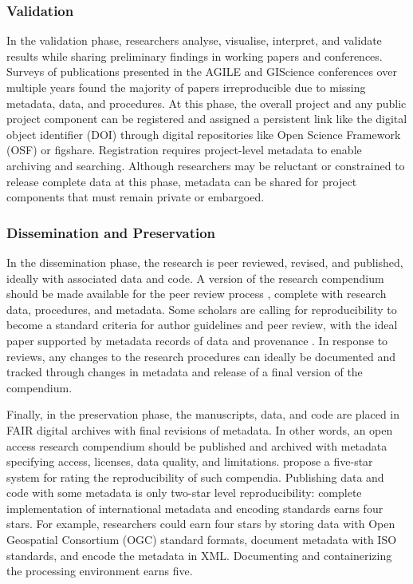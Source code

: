 \documentclass{isprs} %
\begin{document}
\subsubsection{Validation}

In the validation phase, researchers analyse, visualise, interpret, and validate results while sharing preliminary findings in working papers and conferences.
Surveys of publications presented in the AGILE \citep{Nust2018} and GIScience \citep{Ostermann2021}  conferences over multiple years found the majority of papers irreproducible due to missing metadata, data, and procedures.
At this phase, the overall project and any public project component can be registered and assigned a persistent link like the digital object identifier (DOI) through digital repositories like Open Science Framework (OSF) or figshare.
Registration requires project-level metadata to enable archiving and searching.
Although researchers may be reluctant or constrained to release complete data at this phase, metadata can be shared for project components that must remain private or embargoed.

\subsubsection{Dissemination and Preservation}

In the dissemination phase, the research is peer reviewed, revised, and published, ideally with associated data and code.
A version of the research compendium should be made available for the peer review process \citep{Singleton2016}, complete with research data, procedures, and metadata.
Some scholars are calling for reproducibility to become a standard criteria for author guidelines and peer review, with the ideal paper supported by metadata records of data and provenance \citep{Gil2016,Nust2018}.
In response to reviews, any changes to the research procedures can ideally be documented and tracked through changes in metadata and release of a final version of the compendium.

Finally, in the preservation phase, the manuscripts, data, and code are placed in FAIR digital archives with final revisions of metadata.
In other words, an open access research compendium should be published and archived with metadata specifying access, licenses, data quality, and limitations. 
\citep{Wilson2021} propose a five-star system for rating the reproducibility of such compendia.
Publishing data and code with some metadata is only two-star level reproducibility: complete implementation of international metadata and encoding standards earns four stars.
For example, researchers could earn four stars by storing data with Open Geospatial Consortium (OGC) standard formats, document metadata with ISO standards, and encode the metadata in XML.
Documenting and containerizing the processing environment earns five.
\end{document}

